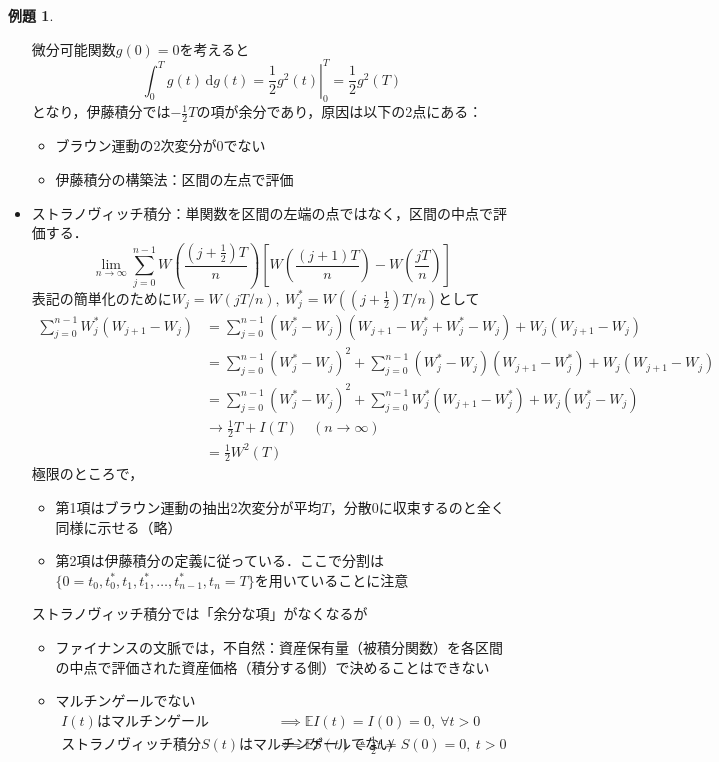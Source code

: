 \documentclass[a4paper, lualatex, ja=standard]{bxjsarticle}
\theoremstyle{definition}
\newtheorem{expl}[thm]{例題}
\newcommand{\E}{\mathbb{E}}
\newcommand{\diff}{\mathrm{d}}
\begin{document}
\begin{expl}
\begin{itemize}
    微分可能関数$g(0)=0$を考えると
    \begin{equation*}
      \int_0^T g(t)\,\diff g(t) = \left.\frac{1}{2}g^2(t)\right|_0^T = \frac{1}{2}g^2(T)
    \end{equation*}
    となり，伊藤積分では$-\frac{1}{2}T$の項が余分であり，原因は以下の2点にある：
    \begin{itemize}
      \item ブラウン運動の2次変分が$0$でない
      \item 伊藤積分の構築法：区間の左点で評価
    \end{itemize}
    \item ストラノヴィッチ積分：単関数を区間の左端の点ではなく，区間の中点で評価する．
    \begin{equation}
      \lim_{n\to\infty}\sum_{j=0}^{n-1}W\left(\frac{(j+\frac{1}{2})T}{n}\right)\left[W\left(\frac{(j+1)T}{n}\right)-W\left(\frac{jT}{n}\right)\right]
    \end{equation}
    表記の簡単化のために$W_j=W(jT/n),\ W_j^\ast=W((j+\frac{1}{2})T/n)$として
    \begin{align*}
      \sum_{j=0}^{n-1} W_j^\ast(W_{j+1}-W_j) 
      &= \sum_{j=0}^{n-1} (W_j^\ast-W_j)(W_{j+1}-W_j^\ast+W_j^\ast -  W_j) + W_j(W_{j+1}-W_j)\\
      &= \sum_{j=0}^{n-1} (W_j^\ast-W_j)^2 + \sum_{j=0}^{n-1}(W_j^\ast-W_j)(W_{j+1}-W_j^\ast) + W_j(W_{j+1}-W_j)\\
      &= \sum_{j=0}^{n-1} (W_j^\ast-W_j)^2 + \sum_{j=0}^{n-1}W_j^\ast(W_{j+1}-W_j^\ast) + W_j(W_j^\ast-W_j)\\
      &\to \frac{1}{2}T + I(T) \quad (n\to\infty) \\
      &= \frac{1}{2}W^2(T)
    \end{align*}
    極限のところで，
    \begin{itemize}
      \item 第1項はブラウン運動の抽出2次変分が平均$T$，分散$0$に収束するのと全く同様に示せる（略）
      \item 第2項は伊藤積分の定義に従っている．ここで分割は$\{0=t_0, t_0^\ast, t_1, t_1^\ast, \ldots, t_{n-1}^\ast, t_n=T\}$を用いていることに注意
    \end{itemize}
    ストラノヴィッチ積分では「余分な項」がなくなるが
    \begin{itemize}
      \item ファイナンスの文脈では，不自然：資産保有量（被積分関数）を各区間の中点で評価された資産価格（積分する側）で決めることはできない
      \item マルチンゲールでない
      \begin{align*}
        \text{$I(t)$はマルチンゲール} &\implies \E I(t) = I(0) = 0,\ \forall t>0\\
        \text{ストラノヴィッチ積分$S(t)$はマルチンゲールでない} &\impliedby \E S(t)=\frac{1}{2}t \neq S(0)=0,\ t>0
      \end{align*}
    \end{itemize}
  \end{itemize}
\end{expl}
\end{document}
